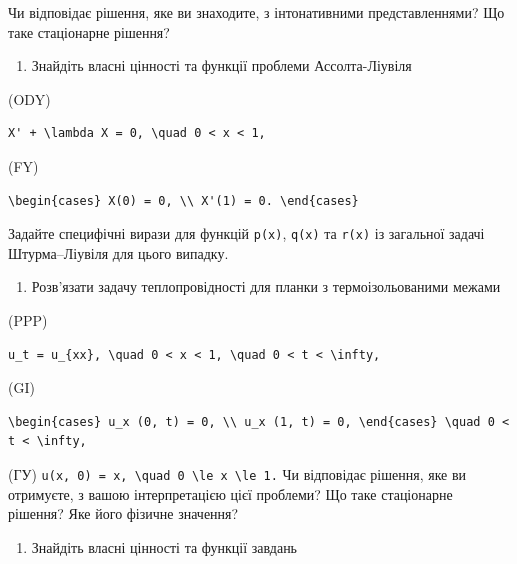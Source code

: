 \documentclass[
  ukrainian,
]{article}
\providecommand{\tightlist}{%
  \setlength{\itemsep}{0pt}\setlength{\parskip}{0pt}}
\begin{document}
Чи відповідає рішення, яке ви знаходите, з інтонативними
представленнями? Що таке стаціонарне рішення?

\begin{enumerate}
\def\labelenumi{\arabic{enumi}.}
\setcounter{enumi}{1}
\tightlist
\item
  Знайдіть власні цінності та функції проблеми Ассолта-Ліувіля
\end{enumerate}

(ODY)

\begin{verbatim}
X' + \lambda X = 0, \quad 0 < x < 1,
\end{verbatim}

(FY)

\begin{verbatim}
\begin{cases} X(0) = 0, \\ X'(1) = 0. \end{cases}
\end{verbatim}

Задайте специфічні вирази для функцій \texttt{p(x)}, \texttt{q(x)} та
\texttt{r(x)} із загальної задачі Штурма--Ліувіля для цього випадку.

\begin{enumerate}
\def\labelenumi{\arabic{enumi}.}
\setcounter{enumi}{2}
\tightlist
\item
  Розв'язати задачу теплопровідності для планки з термоізольованими
  межами
\end{enumerate}

(PPP)

\begin{verbatim}
u_t = u_{xx}, \quad 0 < x < 1, \quad 0 < t < \infty,
\end{verbatim}

(GI)

\begin{verbatim}
\begin{cases} u_x (0, t) = 0, \\ u_x (1, t) = 0, \end{cases} \quad 0 < t < \infty,
\end{verbatim}

(ГУ)
\texttt{u(x,\ 0)\ =\ x,\ \textbackslash{}quad\ 0\ \textbackslash{}le\ x\ \textbackslash{}le\ 1.}
Чи відповідає рішення, яке ви отримуєте, з вашою інтерпретацією цієї
проблеми? Що таке стаціонарне рішення? Яке його фізичне значення?

\begin{enumerate}
\def\labelenumi{\arabic{enumi}.}
\setcounter{enumi}{3}
\tightlist
\item
  Знайдіть власні цінності та функції завдань
\end{enumerate}
\end{document}
